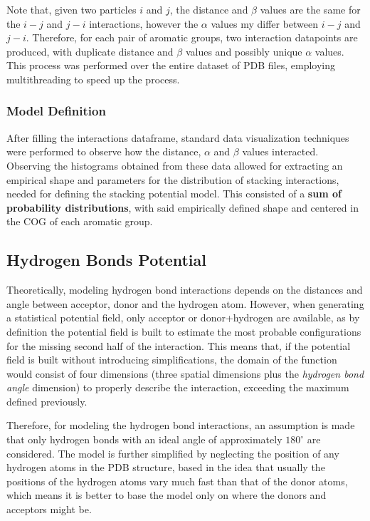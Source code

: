       Note that, given two particles $i$ and $j$, the distance and $\beta$ values are the same for the $i-j$ and $j-i$ interactions, however the $\alpha$ values my differ between $i-j$ and $j-i$. Therefore, for each pair of aromatic groups, two interaction datapoints are produced, with duplicate distance and $\beta$ values and possibly unique $\alpha$ values. This process was performed over the entire dataset of PDB files, employing multithreading to speed up the process.

    \subsubsection{Model Definition}
      After filling the interactions dataframe, standard data visualization techniques were performed to observe how the distance, $\alpha$ and $\beta$ values interacted. Observing the histograms obtained from these data allowed for extracting an empirical shape and parameters for the distribution of stacking interactions, needed for defining the stacking potential model. This consisted of a \textbf{sum of probability distributions}, with said empirically defined shape and centered in the COG of each aromatic group.

  \subsection{Hydrogen Bonds Potential}
    Theoretically, modeling hydrogen bond interactions depends on the distances and angle between acceptor, donor and the hydrogen atom. However, when generating a statistical potential field, only acceptor or donor+hydrogen are available, as by definition the potential field is built to estimate the most probable configurations for the missing second half of the interaction. This means that, if the potential field is built without introducing simplifications, the domain of the function would consist of four dimensions (three spatial dimensions plus the \textit{hydrogen bond angle} dimension) to properly describe the interaction, exceeding the maximum defined previously.

    Therefore, for modeling the hydrogen bond interactions, an assumption is made that only hydrogen bonds with an ideal angle of approximately $180^{\circ}$ are considered. The model is further simplified by neglecting the position of any hydrogen atoms in the PDB structure, based in the idea that usually the positions of the hydrogen atoms vary much fast than that of the donor atoms, which means it is better to base the model only on where the donors and acceptors might be.


